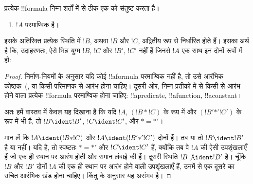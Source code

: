 \documentclass[../../../include/open-logic-section]{subfiles}
\begin{document}
\begin{prop}[अद्वितीय पठनीयता]
प्रत्येक !!{formula} निम्न शर्तों में से ठीक एक को संतुष्ट करता है।
\begin{enumerate}
\item $!A$ परमाण्विक है।







\end{enumerate}
इसके अतिरिक्त प्रत्येक स्थिति में $!B$, अथवा $!B$ और $!C$, अद्वितीय रूप से
निर्धारित होते हैं। इसका अर्थ है कि, उदाहरणतः, ऐसे भिन्न युग्म $!B$, $!C$
और $!B'$, $!C'$ नहीं हैं जिनसे $!A$ एक साथ इन दोनों रूपों में हो:
\end{prop}

\begin{proof}
निर्माण-नियमों के अनुसार यदि कोई !!a{formula} परमाण्विक नहीं है, तो उसे
आरंभिक कोष्ठक~(,  या किसी परिमाणक से आरंभ होना
चाहिए। दूसरी ओर, निम्न प्रतीकों में से किसी से आरंभ होने वाला प्रत्येक
!!{formula} परमाण्विक होना चाहिए: !!a{predicate}, !!a{function},
!!a{constant}।

अतः हमें वास्तव में केवल यह दिखाना है कि यदि $!A$, $(!B \ast
!C)$ के रूप
में और $(!B' \mathbin{\ast'} !C')$ के रूप में भी है, तो $!B \ident
!B'$,
$!C \ident !C'$, और $\ast = {\ast'}$।

मान लें कि $!A \ident (!B \ast !C)$ और $!A \ident (!B'
\mathbin{\ast'} !C')$ दोनों हैं। तब या तो $!B \ident !B'$ है या नहीं। यदि
है, तो स्पष्टतः $\ast = {\ast'}$ और $!C \ident !C'$ हैं, क्योंकि तब वे
$!A$ की ऐसी उपशृंखलाएँ हैं जो एक ही स्थान पर आरंभ होती और समान लंबाई की हैं।
दूसरी स्थिति $!B \not\ident !B'$ है। चूँकि $!B$ और $!B'$ दोनों $!A$ की
एक ही स्थान पर आरंभ होने वाली उपशृंखलाएँ हैं, उनमें से एक दूसरे का उचित
आरंभिक खंड होना चाहिए। किंतु  के अनुसार यह असंभव है।
\end{proof}
\end{document}
